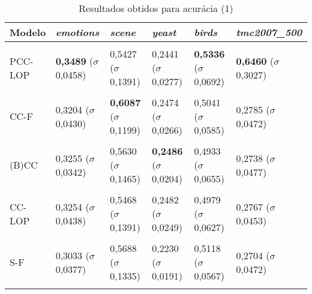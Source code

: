 \begin{table}[htbp]
	\centering
	\caption{Resultados obtidos para acurácia (1)}
		\begin{tabular}
        { p{0.88in} p{0.88in} p{0.88in} p{0.88in} p{0.88in} p{0.88in} }
        
        \hline
Modelo & \textit{emotions} & \textit{scene} & \textit{yeast} & \textit{birds} & \textit{tmc2007\_500} \\ 
\hline \\

PCC-LOP & \textbf{0,3489} \newline ($\sigma$ 0,0458) & 0,5427 \newline ($\sigma$ 0,1391) & 0,2441 \newline ($\sigma$ 0,0277) & \textbf{0,5336} \newline ($\sigma$ 0,0692) & \textbf{0,6460} \newline ($\sigma$ 0,3027) \\ \\
CC-F & 0,3204 \newline ($\sigma$ 0,0430) & \textbf{0,6087} \newline ($\sigma$ 0,1199) & 0,2474 \newline ($\sigma$ 0,0266) & 0,5041 \newline ($\sigma$ 0,0585) & 0,2785 \newline ($\sigma$ 0,0472) \\ \\
(B)CC & 0,3255 \newline ($\sigma$ 0,0342) & 0,5630 \newline ($\sigma$ 0,1465) & \textbf{0,2486} \newline ($\sigma$ 0,0204) & 0,4933 \newline ($\sigma$ 0,0655) & 0,2738 \newline ($\sigma$ 0,0477) \\ \\
CC-LOP & 0,3254 \newline ($\sigma$ 0,0438) & 0,5468 \newline ($\sigma$ 0,1391) & 0,2482 \newline ($\sigma$ 0,0249) & 0,4979 \newline ($\sigma$ 0,0627) & 0,2767 \newline ($\sigma$ 0,0453) \\ \\
S-F & 0,3033 \newline ($\sigma$ 0,0377) & 0,5688 \newline ($\sigma$ 0,1335) & 0,2230 \newline ($\sigma$ 0,0191) & 0,5118 \newline ($\sigma$ 0,0567) & 0,2704 \newline ($\sigma$ 0,0472) \\ \\

\end{tabular}
\end{table}
